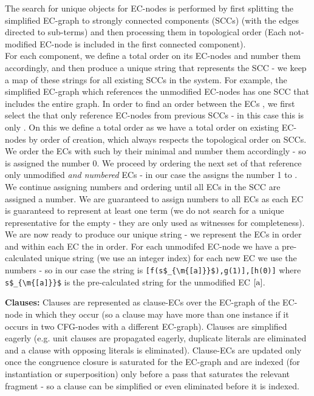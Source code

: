 The search for unique objects for EC-nodes is performed by first splitting the simplified EC-graph to strongly connected components (SCCs) (with the \GFA{} edges directed to sub-terms) and then processing them in topological order (Each not-modified EC-node is included in the first connected component).\\
For each component, we define a total order on its EC-nodes and number them accordingly, and then produce a unique string that represents the SCC - we keep a map of these strings for all existing SCCs in the system.
For example, the simplified EC-graph \s{[f(a),g(h(b))],[h(b)]} which references the unmodified EC-nodes \s{[a],[b]} has one SCC that includes the entire graph. In order to find an order between the ECs \m{[f(a),g(h(f(a)))],[h(f(a))]}, we first select the \GFAs{} that only reference EC-nodes from previous SCCs - in this case this is only . On this \GFA{} we define a total order as we have a total order on existing EC-nodes by order of creation, which always respects the topological order on SCCs. 
We order the ECs with such \GFAs{} by their minimal \GFA{} and number them accordingly - so \m{[f(a),g(h(b))]} is assigned the number 0.
We proceed by ordering the next set of \GFAs{} that reference only unmodified \emph{and numbered} ECs - in our case the \GFA{} assigns the number 1 to \m{[h(f(a))]}. We continue assigning numbers and ordering \GFAs{} until all ECs in the SCC are assigned a number.
We are guaranteed to assign numbers to all ECs as each EC is guaranteed to represent at least one term (we do not search for a unique representative for the empty \GTs{} - they are only used as witnesses for completeness).
We are now ready to produce our unique string - we represent the ECs in order and within each EC the \GFAs{} in order. For each unmodifed EC-node we have a pre-calculated unique string (we use an integer index) for each new EC we use the numbers - so in our case the string is
\lstinline|[f(s$_{\m{[a]}}$),g(1)],[h(0)]| where \lstinline|s$_{\m{[a]}}$| is the pre-calculated string for the unmodified EC $\mathrm{[a]}$.

\textbf{Clauses:}
Clauses are represented as clause-ECs over the EC-graph of the EC-node in which they occur (so a clause may have more than one instance if it occurs in two CFG-nodes with a different EC-graph).
Clauses are simplified eagerly (e.g. unit clauses are propagated eagerly, duplicate literals are eliminated and a clause with opposing literals is eliminated). Clause-ECs are updated only once the congruence closure is saturated for the EC-graph and are indexed (for instantiation or superposition) only before a pass that saturates the relevant fragment - so a clause can be simplified or even eliminated before it is indexed.

